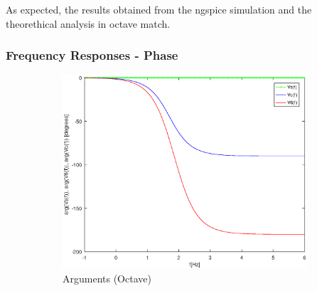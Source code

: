 As expected, the results obtained from the ngspice simulation and the theorethical analysis in octave match.

\subsubsection{Frequency Responses - Phase}

\begin{figure}[H] 
\centering
\begin{subfigure}{0.4\textwidth}
\includegraphics[width=\textwidth]{Arguments.eps}
\caption{Arguments (Octave)}
\label{fig:first}
\end{subfigure}
\begin{subfigure}{0.3\textwidth}

\end{subfigure}
\end{figure}
